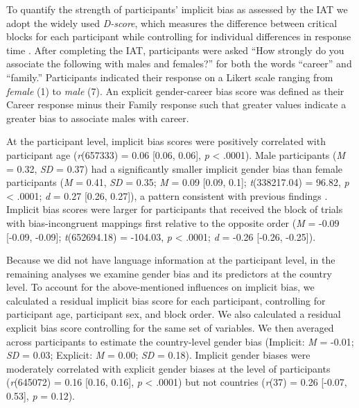 \documentclass[9pt,twocolumn,twoside,lineno]{pnas-new}
\begin{document}
To quantify the strength of participants’ implicit bias as assessed by the IAT we adopt the widely used  \emph{D-score}, which measures the difference between critical blocks for each participant while controlling for individual differences
in response time \cite{greenwald1998measuring}. After completing
the IAT, participants were asked \enquote{How strongly do you associate
the following with males and females?} for both the words
\enquote{career} and \enquote{family.} Participants indicated their
response on a Likert scale ranging from \emph{female} (1) to \emph{male}
(7). An explicit gender-career bias score was defined as their Career response minus their Family response such that greater values indicate a greater bias to associate males with career.

At the participant level, implicit bias scores were positively correlated with
participant age (\emph{r}(657333) = 0.06 {[}0.06, 0.06{]}, \emph{p} \textless{} .0001). Male participants (\emph{M} = 0.32, \emph{SD} = 0.37) had a significantly smaller implicit gender bias than female participants (\emph{M} = 0.41, \emph{SD} = 0.35; \emph{M} = 0.09 {[}0.09, 0.1{]}; \emph{t}(338217.04) = 96.82, \emph{p} \textless{} .0001; \emph{d} = 0.27 {[}0.26, 0.27{]}), a pattern consistent with previous findings \cite{nosek2002harvesting}. Implicit bias scores were larger for participants that received the block of trials with bias-incongruent mappings first relative to the opposite order (\emph{M} = -0.09 {[}-0.09, -0.09{]}; \emph{t}(652694.18) = -104.03, \emph{p} \textless{} .0001; \emph{d} = -0.26 {[}-0.26, -0.25{]}).

Because we did not have language information at the participant level, in the remaining analyses we examine gender bias and its predictors at the country level. To account for the above-mentioned influences on implicit bias, we calculated a residual implicit bias score for each participant, controlling for participant age, participant sex, and block order. We also calculated a residual explicit bias score controlling for the same set of variables. We then averaged across participants to estimate the country-level gender bias (Implicit: \emph{M} = -0.01; \emph{SD} = 0.03; Explicit: \emph{M} = 0.00; \emph{SD} = 0.18). Implicit gender biases were moderately correlated with explicit gender biases at the level of participants (\emph{r}(645072) = 0.16 {[}0.16, 0.16{]}, \emph{p} \textless{} .0001) but not countries (\emph{r}(37) = 0.26 {[}-0.07, 0.53{]}, \emph{p} = 0.12).
\end{document}
